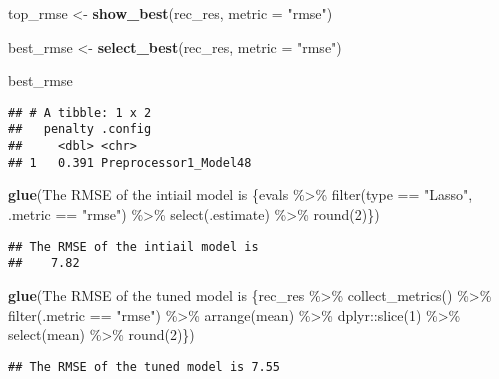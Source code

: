 \documentclass[
]{book}
\newenvironment{Shaded}{\begin{snugshade}}{\end{snugshade}}
\newcommand{\DataTypeTok}[1]{\textcolor[rgb]{0.13,0.29,0.53}{#1}}
\newcommand{\KeywordTok}[1]{\textcolor[rgb]{0.13,0.29,0.53}{\textbf{#1}}}
\newcommand{\NormalTok}[1]{#1}
\newcommand{\StringTok}[1]{\textcolor[rgb]{0.31,0.60,0.02}{#1}}
\begin{document}
\begin{Shaded}
\begin{Highlighting}[]
\NormalTok{top\_rmse \textless{}{-}}\StringTok{ }\KeywordTok{show\_best}\NormalTok{(rec\_res, }\DataTypeTok{metric =} \StringTok{"rmse"}\NormalTok{)}

\NormalTok{best\_rmse \textless{}{-}}\StringTok{ }\KeywordTok{select\_best}\NormalTok{(rec\_res, }\DataTypeTok{metric =} \StringTok{"rmse"}\NormalTok{)}

\NormalTok{best\_rmse}
\end{Highlighting}
\end{Shaded}

\begin{verbatim}
## # A tibble: 1 x 2
##   penalty .config              
##     <dbl> <chr>                
## 1   0.391 Preprocessor1_Model48
\end{verbatim}

\begin{Shaded}
\begin{Highlighting}[]
\KeywordTok{glue}\NormalTok{(}\StringTok{\textquotesingle{}The RMSE of the intiail model is}
\StringTok{     \{evals \%\textgreater{}\%}
\StringTok{  filter(type == "Lasso", .metric == "rmse") \%\textgreater{}\%}
\StringTok{  select(.estimate) \%\textgreater{}\%}
\StringTok{  round(2)\}\textquotesingle{}}\NormalTok{)}
\end{Highlighting}
\end{Shaded}

\begin{verbatim}
## The RMSE of the intiail model is
##    7.82
\end{verbatim}

\begin{Shaded}
\begin{Highlighting}[]
\KeywordTok{glue}\NormalTok{(}\StringTok{\textquotesingle{}The RMSE of the tuned model is \{rec\_res \%\textgreater{}\%}
\StringTok{  collect\_metrics() \%\textgreater{}\%}
\StringTok{  filter(.metric == "rmse") \%\textgreater{}\%}
\StringTok{  arrange(mean) \%\textgreater{}\%}
\StringTok{  dplyr::slice(1) \%\textgreater{}\%}
\StringTok{  select(mean) \%\textgreater{}\%}
\StringTok{  round(2)\}\textquotesingle{}}\NormalTok{)}
\end{Highlighting}
\end{Shaded}

\begin{verbatim}
## The RMSE of the tuned model is 7.55
\end{verbatim}
\end{document}
